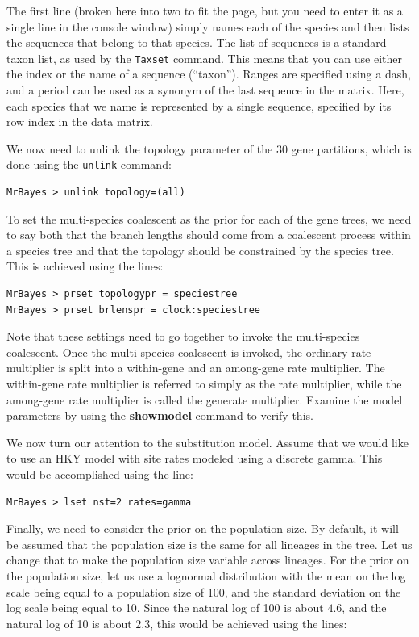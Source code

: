 \documentclass[12pt]{book}
\newcommand{\ttt}[1]{\texttt{#1} }
\begin{document}
The first line (broken here into two to fit the page, but you need to enter it as a single line in the console
window) simply names each of the species and then lists the sequences that belong to that species.
The list of sequences is a standard taxon list, as used by the \ttt{Taxset} command. This means
that you can use either the index or the name of a sequence (``taxon''). Ranges are specified using a dash, and
a period can be used as a synonym of the last sequence in the matrix. Here, each species that we name is
represented by a single sequence, specified by its row index in the data matrix.

We now need to unlink the topology parameter of the 30 gene partitions, which is done using the \ttt{unlink}
command:

\begin{verbatim}
MrBayes > unlink topology=(all)
\end{verbatim}

To set the multi-species coalescent as the prior for each of the gene trees, we need to say both that the
branch lengths should come from a coalescent process within a species tree and that the topology should
be constrained by the species tree. This is achieved using the lines:

\begin{singlespacing}
\begin{verbatim}
MrBayes > prset topologypr = speciestree
MrBayes > prset brlenspr = clock:speciestree
\end{verbatim}
\end{singlespacing}

Note that these settings need to go together to invoke the multi-species coalescent. Once the multi-species
coalescent is invoked, the ordinary rate multiplier is split into a within-gene and an among-gene rate
multiplier. The within-gene rate multiplier is referred to simply as the rate multiplier, while the among-gene
rate multiplier is called the generate multiplier. Examine the model parameters by using the \textbf{showmodel}
command to verify this.

We now turn our attention to the substitution model. Assume that we would like to use an HKY model
with site rates modeled using a discrete gamma. This would be accomplished using the line:

\begin{verbatim}
MrBayes > lset nst=2 rates=gamma
\end{verbatim}

Finally, we need to consider the prior on the population size. By default, it will be assumed that the
population size is the same for all lineages in the tree. Let us change that to make the population
size variable across lineages. For the prior on the population size, let us use a lognormal distribution
with the mean on the log scale being equal to a population size of 100, and the standard deviation
on the log scale being equal to 10. Since the natural log of 100 is about $4.6$, and the natural log
of 10 is about $2.3$, this would be achieved using the lines:
\end{document}
